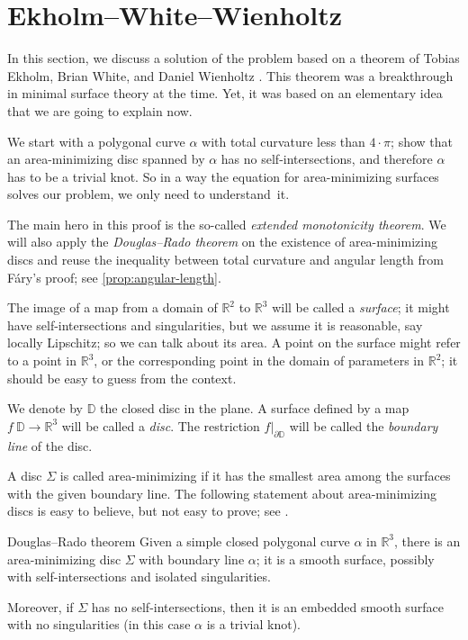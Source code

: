  \section{Ekholm--White--Wienholtz}

In this section, we discuss a solution of the problem based on a theorem of Tobias Ekholm, Brian White, and Daniel Wienholtz \cite{EWW_embed}.
This theorem was a breakthrough in minimal surface theory at the time.
Yet, it was based on an elementary idea that we are going to explain now.

We start with a polygonal curve $\alpha$ with total curvature less than $4\cdot\pi$;
show that an area-minimizing disc spanned by $\alpha$ has no self-intersections, and therefore $\alpha$ has to be a trivial knot.
So in a way the equation for area-minimizing surfaces solves our problem, we only need to understand~it.

The main hero in this proof is the so-called \emph{extended monotonicity theorem}.
We will also apply the \emph{Douglas--Rado theorem} on the existence of area-minimizing discs and reuse the inequality between total curvature and angular length from F\'ary's proof; see \ref{prop:angular-length}.

The image of a map from a domain of $\mathbb{R}^2$ to $\mathbb{R}^3$ will be called a \emph{surface};
it might have self-intersections and singularities, but we assume it is reasonable, say locally Lipschitz; so we can talk about its area.
A point on the surface might refer to a point in $\mathbb{R}^3$, or the corresponding point in the domain of parameters in $\mathbb{R}^2$;
it should be easy to guess from the context.

We denote by $\mathbb{D}$ the closed disc in the plane.
A surface defined by a map $f\:\mathbb{D}\to\mathbb{R}^3$ will be called a \emph{disc}.
The restriction $f|_{\partial \mathbb{D}}$ will be called the \emph{boundary line} of the disc.

A disc $\Sigma$ is called area-minimizing if it has the smallest area among the surfaces with the given boundary line.
The following statement about area-minimizing discs is easy to believe, but not easy to prove; see \cite{white-lectures}.

\begin{thm}{Douglas--Rado theorem}\label{thm:min-exists}
Given a simple closed polygonal curve $\alpha$ in $\mathbb{R}^3$, there is an area-minimizing disc $\Sigma$ with boundary line $\alpha$; it is a smooth surface, possibly with self-intersections and isolated singularities.

Moreover, if $\Sigma$ has no self-intersections, then it is an embedded smooth surface with no singularities (in this case $\alpha$ is a trivial knot).
\end{thm}


